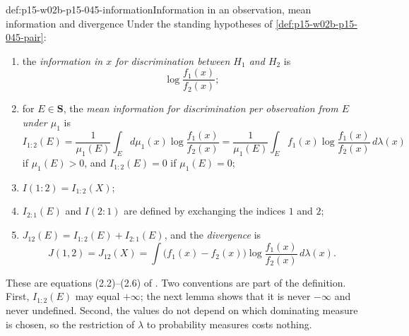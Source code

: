 \begin{hbdefinition}{def:p15-w02b-p15-045-information}{Information in an observation, mean information and divergence}
Under the standing hypotheses of \cref{def:p15-w02b-p15-045-pair}:
\begin{enumerate}
\item the \emph{information in \(x\) for discrimination between \(H_1\)
and \(H_2\)} is
\[
  \log\frac{f_1(x)}{f_2(x)};
\]
\item for \(E\in\mathbf S\), the \emph{mean information for
discrimination per observation from \(E\) under \(\mu_1\)} is
\[
  I_{1:2}(E)=\frac1{\mu_1(E)}\int_E d\mu_1(x)\log\frac{f_1(x)}{f_2(x)}
            =\frac1{\mu_1(E)}\int_E f_1(x)\log\frac{f_1(x)}{f_2(x)}\,d\lambda(x)
\]
if \(\mu_1(E)>0\), and \(I_{1:2}(E)=0\) if \(\mu_1(E)=0\);
\item \(I(1:2)=I_{1:2}(X)\);
\item \(I_{2:1}(E)\) and \(I(2:1)\) are defined by exchanging the indices
\(1\) and \(2\);
\item \(J_{12}(E)=I_{1:2}(E)+I_{2:1}(E)\), and the \emph{divergence} is
\[
  J(1,2)=J_{12}(X)=\int\bigl(f_1(x)-f_2(x)\bigr)\log\frac{f_1(x)}{f_2(x)}\,d\lambda(x).
\]
\end{enumerate}
\end{hbdefinition}

These are equations (2.2)--(2.6) of
\cite[pp.~80--81]{KullbackLeibler1951Information}. Two conventions are
part of the definition. First, \(I_{1:2}(E)\) may equal \(+\infty\); the
next lemma shows that it is never \(-\infty\) and never undefined.
Second, the values do not depend on which dominating measure is chosen,
so the restriction of \(\lambda\) to probability measures costs nothing.

